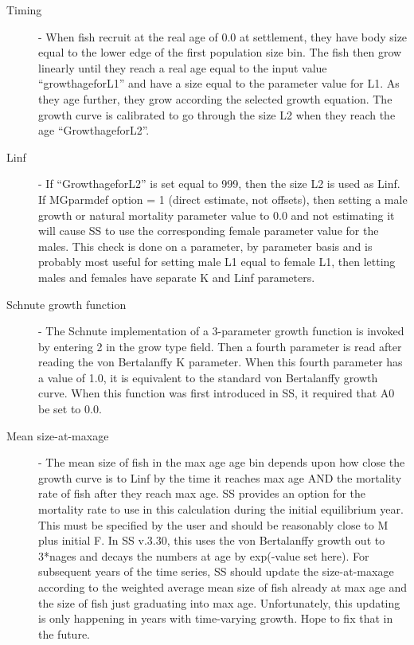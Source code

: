 \begin{description}
	\item [Timing] - When fish recruit at the real age of 0.0 at settlement, they have body size equal to the lower edge of the first population size bin.  The fish then grow linearly until they reach a real age equal to the input value “growth\textunderscore age\textunderscore for\textunderscore L1” and have a size equal to the parameter value for L1.  As they age further, they grow according the selected growth equation.  The growth curve is calibrated to go through the size L2 when they reach the age “Growth\textunderscore age\textunderscore for\textunderscore L2”.
	
	\item  [Linf] - If “Growth\textunderscore age\textunderscore for\textunderscore L2” is set equal to 999, then the size L2 is used as Linf.  If MGparm\textunderscore def option = 1 (direct estimate, not offsets), then setting a male growth or natural mortality parameter value to 0.0 and not estimating it will cause SS to use the corresponding female parameter value for the males. This check is done on a parameter, by parameter basis and is probably most useful for setting male L1 equal to female L1, then letting males and females have separate K and Linf parameters.
	
	\item[Schnute growth function] - The Schnute implementation of a 3-parameter growth function is invoked by entering 2 in the grow type field.  Then a fourth parameter is read after reading the von Bertalanffy K parameter.  When this fourth parameter has a value of 1.0, it is equivalent to the standard von Bertalanffy growth curve.  When this function was first introduced in SS, it required that A0 be set to 0.0.
	
	\item[Mean size-at-maxage] - The mean size of fish in the max age age bin depends upon how close the growth curve is to Linf by the time it reaches max age AND the mortality rate of fish after they reach max age.  SS provides an option for the mortality rate to use in this calculation during the initial equilibrium year.  This must be specified by the user and should be reasonably close to M plus initial F.  In SS v.3.30, this uses the von Bertalanffy growth out to 3*nages and decays the numbers at age by exp(-value set here). For subsequent years of the time series, SS should update the size-at-maxage according to the weighted average mean size of fish already at max age and the size of fish just graduating into max age.  Unfortunately, this updating is only happening in years with time-varying growth.  Hope to fix that in the future.
	

\end{description}
